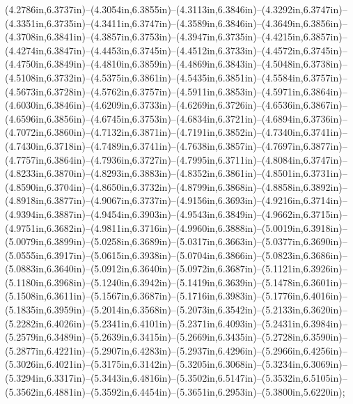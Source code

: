 (4.2786in,6.3737in)--(4.3054in,6.3855in)--(4.3113in,6.3846in)--(4.3292in,6.3747in)--(4.3351in,6.3735in)--(4.3411in,6.3747in)--(4.3589in,6.3846in)--(4.3649in,6.3856in)--(4.3708in,6.3841in)--(4.3857in,6.3753in)--(4.3947in,6.3735in)--(4.4215in,6.3857in)--(4.4274in,6.3847in)--(4.4453in,6.3745in)--(4.4512in,6.3733in)--(4.4572in,6.3745in)--(4.4750in,6.3849in)--(4.4810in,6.3859in)--(4.4869in,6.3843in)--(4.5048in,6.3738in)--(4.5108in,6.3732in)--(4.5375in,6.3861in)--(4.5435in,6.3851in)--(4.5584in,6.3757in)--(4.5673in,6.3728in)--(4.5762in,6.3757in)--(4.5911in,6.3853in)--(4.5971in,6.3864in)--(4.6030in,6.3846in)--(4.6209in,6.3733in)--(4.6269in,6.3726in)--(4.6536in,6.3867in)--(4.6596in,6.3856in)--(4.6745in,6.3753in)--(4.6834in,6.3721in)--(4.6894in,6.3736in)--(4.7072in,6.3860in)--(4.7132in,6.3871in)--(4.7191in,6.3852in)--(4.7340in,6.3741in)--(4.7430in,6.3718in)--(4.7489in,6.3741in)--(4.7638in,6.3857in)--(4.7697in,6.3877in)--(4.7757in,6.3864in)--(4.7936in,6.3727in)--(4.7995in,6.3711in)--(4.8084in,6.3747in)--(4.8233in,6.3870in)--(4.8293in,6.3883in)--(4.8352in,6.3861in)--(4.8501in,6.3731in)--(4.8590in,6.3704in)--(4.8650in,6.3732in)--(4.8799in,6.3868in)--(4.8858in,6.3892in)--(4.8918in,6.3877in)--(4.9067in,6.3737in)--(4.9156in,6.3693in)--(4.9216in,6.3714in)--(4.9394in,6.3887in)--(4.9454in,6.3903in)--(4.9543in,6.3849in)--(4.9662in,6.3715in)--(4.9751in,6.3682in)--(4.9811in,6.3716in)--(4.9960in,6.3888in)--(5.0019in,6.3918in)--(5.0079in,6.3899in)--(5.0258in,6.3689in)--(5.0317in,6.3663in)--(5.0377in,6.3690in)--(5.0555in,6.3917in)--(5.0615in,6.3938in)--(5.0704in,6.3866in)--(5.0823in,6.3686in)--(5.0883in,6.3640in)--(5.0912in,6.3640in)--(5.0972in,6.3687in)--(5.1121in,6.3926in)--(5.1180in,6.3968in)--(5.1240in,6.3942in)--(5.1419in,6.3639in)--(5.1478in,6.3601in)--(5.1508in,6.3611in)--(5.1567in,6.3687in)--(5.1716in,6.3983in)--(5.1776in,6.4016in)--(5.1835in,6.3959in)--(5.2014in,6.3568in)--(5.2073in,6.3542in)--(5.2133in,6.3620in)--(5.2282in,6.4026in)--(5.2341in,6.4101in)--(5.2371in,6.4093in)--(5.2431in,6.3984in)--(5.2579in,6.3489in)--(5.2639in,6.3415in)--(5.2669in,6.3435in)--(5.2728in,6.3590in)--(5.2877in,6.4221in)--(5.2907in,6.4283in)--(5.2937in,6.4296in)--(5.2966in,6.4256in)--(5.3026in,6.4021in)--(5.3175in,6.3142in)--(5.3205in,6.3068in)--(5.3234in,6.3069in)--(5.3294in,6.3317in)--(5.3443in,6.4816in)--(5.3502in,6.5147in)--(5.3532in,6.5105in)--(5.3562in,6.4881in)--(5.3592in,6.4454in)--(5.3651in,6.2953in)--(5.3800in,5.6220in);
